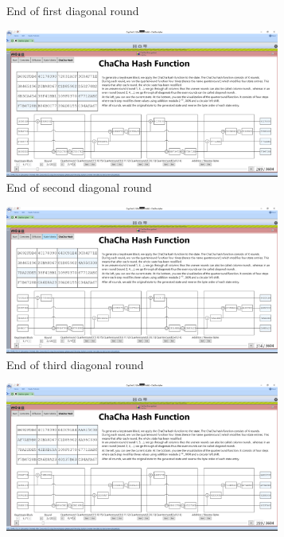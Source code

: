 \begin{figure}
\begin{subfigure}{0.5\textwidth}
  \caption{End of first diagonal round}
  \label{fig:chachahash.dr.1}
\end{subfigure}%
\begin{subfigure}{0.5\textwidth}
  \centering
  \includegraphics[width=0.99\textwidth]{figures/ct2/chachahash/chachahash-dr2-end.png}
  \caption{End of second diagonal round}
  \label{fig:chachahash.dr.2}
\end{subfigure}
\begin{subfigure}{0.5\textwidth}
  \centering
  \includegraphics[width=0.99\textwidth]{figures/ct2/chachahash/chachahash-dr3-end.png}
  \caption{End of third diagonal round}
  \label{fig:chachahash.dr.3}
\end{subfigure}%
\begin{subfigure}{0.5\textwidth}
  \centering
  \includegraphics[width=0.99\textwidth]{figures/ct2/chachahash/chachahash-dr4-end.png}

\end{subfigure}
\end{figure}
